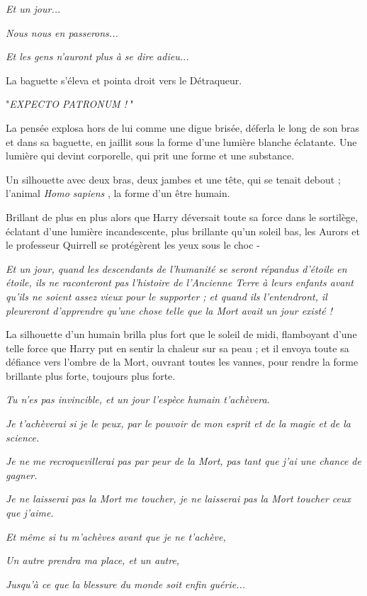 \emph{Et un jour...} 

\emph{Nous nous en passerons...} 

\emph{Et les gens n'auront plus à se dire adieu...} 

La baguette s'éleva et pointa droit vers le Détraqueur.

"\emph{EXPECTO PATRONUM !} "

La pensée explosa hors de lui comme une digue brisée, déferla le long de son bras et dans sa baguette, en jaillit sous la forme d'une lumière blanche éclatante. Une lumière qui devint corporelle, qui prit une forme et une substance.

Un silhouette avec deux bras, deux jambes et une tête, qui se tenait debout ; l'animal \emph{Homo sapiens} , la forme d'un être humain.

Brillant de plus en plus alors que Harry déversait toute sa force dans le sortilège, éclatant d'une lumière incandescente, plus brillante qu'un soleil bas, les Aurors et le professeur Quirrell se protégèrent les yeux sous le choc -

\emph{Et un jour, quand les descendants de l'humanité se seront répandus d'étoile en étoile, ils ne raconteront pas l'histoire de l'Ancienne Terre à leurs enfants avant qu'ils ne soient assez vieux pour le supporter ; et quand ils l'entendront, il pleureront d'apprendre qu'une chose telle que la Mort avait un jour existé !} 

La silhouette d'un humain brilla plus fort que le soleil de midi, flamboyant d'une telle force que Harry put en sentir la chaleur sur sa peau ; et il envoya toute sa défiance vers l'ombre de la Mort, ouvrant toutes les vannes, pour rendre la forme brillante plus forte, toujours plus forte.

\emph{Tu n'es pas invincible, et un jour l'espèce humain t'achèvera.} 

\emph{Je t'achèverai si je le peux, par le pouvoir de mon esprit et de la magie et de la science.} 

\emph{Je ne me recroquevillerai pas par peur de la Mort, pas tant que j'ai une chance de gagner.} 

\emph{Je ne laisserai pas la Mort me toucher, je ne laisserai pas la Mort toucher ceux que j'aime.} 

\emph{Et même si tu m'achèves avant que je ne t'achève,} 

\emph{Un autre prendra ma place, et un autre,} 

\emph{Jusqu'à ce que la blessure du monde soit enfin guérie...} 

